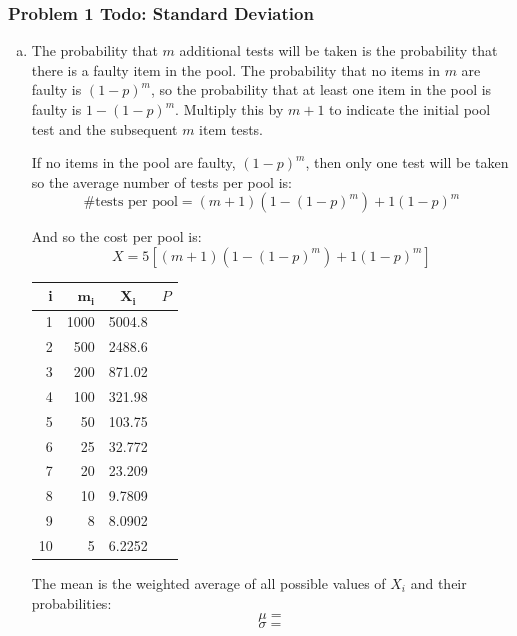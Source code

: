 \documentclass[11pt]{extarticle}
\begin{document}
\singlespacing



\subsubsection*{Problem 1 Todo: Standard Deviation}


\begin{enumerate}[(a)]


\item The probability that $m$ additional tests will be taken is the probability that there is a faulty item in the pool. The probability that no items in $m$ are faulty is $(1-p)^m$, so the probability that at least one item in the pool is faulty is $1-(1-p)^m$. Multiply this by $m+1$ to indicate the initial pool test and the subsequent $m$ item tests. 

If no items in the pool are faulty, $(1-p)^m$, then only one test will be taken so the average number of tests per pool is: $$\text{\# tests per pool} = (m+1)(1-(1-p)^m) + 1(1-p)^m$$

And so the cost per pool is: $$X = 5 \left[ (m+1)(1-(1-p)^m) + 1(1-p)^m \right] $$
\begin{table}[H]
\centering
\begin{tabular}{rrcc}
\toprule
\textbf{i} & $\mathbf{m_i}$ & $\mathbf{X_i}$  & $P$ \\
\midrule
1 & 1000 & 5004.8 \\
2 & 500 & 2488.6 \\
3 & 200 & 871.02 \\
4 & 100& 321.98 \\
5 & 50& 103.75 \\
6 & 25& 32.772 \\
7 & 20& 23.209 \\
8 & 10& 9.7809 \\
9 & 8& 8.0902 \\
10 & 5& 6.2252 \\

\bottomrule
\end{tabular}
\end{table}

The mean is the weighted average of all possible values of $X_i$ and their probabilities: $$ \mu = $$  $$ \sigma = $$


\end{enumerate}
\end{document}
